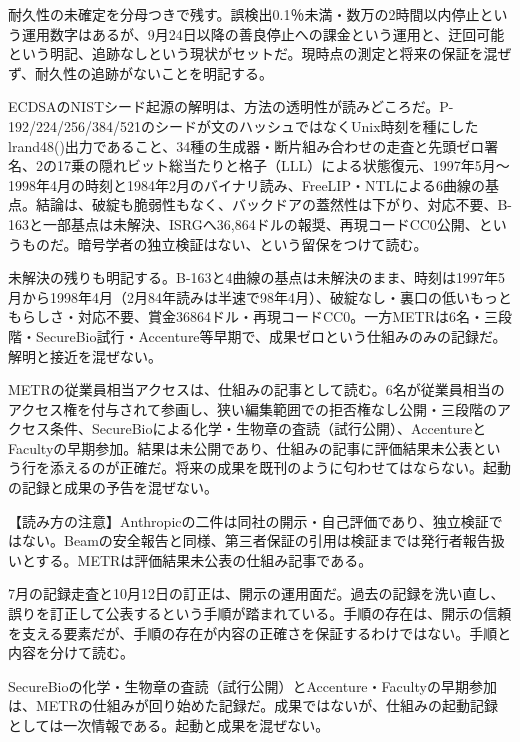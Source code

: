 \documentclass[lualatex,a4paper,10pt]{jlreq}
\begin{document}
耐久性の未確定を分母つきで残す。誤検出0.1％未満・数万の2時間以内停止という運用数字はあるが、9月24日以降の善良停止への課金という運用と、迂回可能という明記、追跡なしという現状がセットだ。現時点の測定と将来の保証を混ぜず、耐久性の追跡がないことを明記する。
\cite{B41,B80}


ECDSAのNISTシード起源の解明は、方法の透明性が読みどころだ。P-192/224/256/384/521のシードが文のハッシュではなくUnix時刻を種にしたlrand48()出力であること、34種の生成器・断片組み合わせの走査と先頭ゼロ署名、2の17乗の隠れビット総当たりと格子（LLL）による状態復元、1997年5月〜1998年4月の時刻と1984年2月のバイナリ読み、FreeLIP・NTLによる6曲線の基点。結論は、破綻も脆弱性もなく、バックドアの蓋然性は下がり、対応不要、B-163と一部基点は未解決、ISRGへ36,864ドルの報奨、再現コードCC0公開、というものだ。暗号学者の独立検証はない、という留保をつけて読む。
\cite{B42,B81}


未解決の残りも明記する。B-163と4曲線の基点は未解決のまま、時刻は1997年5月から1998年4月（2月84年読みは半速で98年4月）、破綻なし・裏口の低いもっともらしさ・対応不要、賞金36864ドル・再現コードCC0。一方METRは6名・三段階・SecureBio試行・Accenture等早期で、成果ゼロという仕組みのみの記録だ。解明と接近を混ぜない。
\cite{B42,B81,B39,B82}


METRの従業員相当アクセスは、仕組みの記事として読む。6名が従業員相当のアクセス権を付与されて参画し、狭い編集範囲での拒否権なし公開・三段階のアクセス条件、SecureBioによる化学・生物章の査読（試行公開）、AccentureとFacultyの早期参加。結果は未公開であり、仕組みの記事に評価結果未公表という行を添えるのが正確だ。将来の成果を既刊のように匂わせてはならない。起動の記録と成果の予告を混ぜない。
\cite{B39,B82}


\begin{tcolorbox}[colback=SurveySoft,colframe=SurveyRule,arc=1mm,boxrule=0.4pt,left=2mm,right=2mm]
【読み方の注意】Anthropicの二件は同社の開示・自己評価であり、独立検証ではない。Beamの安全報告と同様、第三者保証の引用は検証までは発行者報告扱いとする。METRは評価結果未公表の仕組み記事である。
\end{tcolorbox}
\cite{B40,B79,B41,B80,B42,B81,B39,B82}

7月の記録走査と10月12日の訂正は、開示の運用面だ。過去の記録を洗い直し、誤りを訂正して公表するという手順が踏まれている。手順の存在は、開示の信頼を支える要素だが、手順の存在が内容の正確さを保証するわけではない。手順と内容を分けて読む。
\cite{B40,B79}


SecureBioの化学・生物章の査読（試行公開）とAccenture・Facultyの早期参加は、METRの仕組みが回り始めた記録だ。成果ではないが、仕組みの起動記録としては一次情報である。起動と成果を混ぜない。
\cite{B39,B82}
\end{document}
